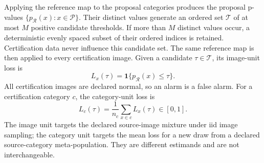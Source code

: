Applying the reference map to the proposal categories produces the proposal p-values $\{p_{\mathcal R}(x):x\in\mathcal P\}$. Their distinct values generate an ordered set $\mathcal{T}$ of at most $M$ positive candidate thresholds. If more than $M$ distinct values occur, a deterministic evenly spaced subset of their ordered indices is retained. Certification data never influence this candidate set. The same reference map is then applied to every certification image. Given a candidate $\tau\in\mathcal T$, its image-unit loss is
\begin{equation}\label{eq:cress-image-loss}
    L_x(\tau)=\mathbf{1}\{p_{\mathcal{R}}(x)\leq\tau\}.
\end{equation}
All certification images are declared normal, so an alarm is a false alarm. For a certification category $c$, the category-unit loss is
\begin{equation}\label{eq:cress-category-loss}
    L_c(\tau)=\frac{1}{n_c}\sum_{x\in c}L_x(\tau)\in[0,1].
\end{equation}
The image unit targets the declared source-image mixture under iid image sampling; the category unit targets the mean loss for a new draw from a declared source-category meta-population. They are different estimands and are not interchangeable.

